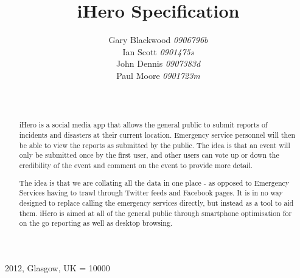 \documentclass{sig-alt-release2}
\begin{document}
\newcommand{\todo}[1]{\textcolor{red}{#1}}
\def\newblock{\hskip .11em plus .33em minus .07em}

 {2012, Glasgow, UK} 
\widowpenalty = 10000

\title{{iHero Specification}}

\author{
  \alignauthor 
  Gary Blackwood \textit{0906796b}\\
  Ian Scott \textit{0901475s}\\
  John Dennis \textit{0907383d}\\
  Paul Moore \textit{0901723m}\\
  \\
  \\
}
\maketitle

\begin{abstract}
iHero is a social media app that allows the general public to submit reports of incidents and disasters at their current location. Emergency service personnel will then be able to view the reports as submitted by the public. The idea is that an event will only be submitted once by the first user, and other users can vote up or down the credibility of the event and comment on the event to provide more detail.

The idea is that we are collating all the data in one place - as opposed to Emergency Services having to trawl through Twitter feeds and Facebook pages. It is in no way designed to replace calling the emergency services directly, but instead as a tool to aid them. iHero is aimed at all of the general public through smartphone optimisation for on the go reporting as well as desktop browsing.
\end{abstract}
\end{document}
